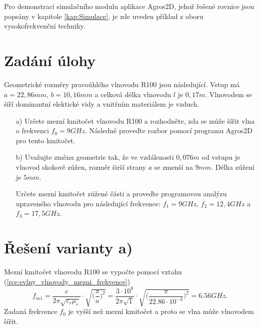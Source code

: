 
Pro demonstraci simulačního modulu aplikace Agros2D, jehož řešené rovnice jsou popsány v kapitole \ref{kap:Simulace}, je zde uveden příklad z oboru vysokofrekvenční techniky. 

\section{Zadání úlohy}
Geometrické rozměry pravoúhlého vlnovodu R100 jsou následující. Vstup má $a = 22,86 \unit{mm}$, $b = 10,16 \unit{mm}$ a celková délka vlnovodu $l$ je $0,17 \unit{m}$. Vlnovodem se šíří dominantní elektické vidy a vnitřním materiálem je vzduch. 
\begin{enumerate}
\item[a)] Určete mezní kmitočet vlnovodu R100 a rozhodněte, zda se může šířit vlna o frekvenci $f_0 = 9 \unit{GHz}$. Následně proveďte rozbor pomocí programu Agros2D pro tento kmitočet. 
\item[b)] Uvažujte změnu geometrie tak, že ve vzdálenosti $0,076 \unit{m}$ od vstupu je vlnovod skokově zúžen, rozměr širší strany $a$ se zmenší na $9 \unit {mm}$. Délka zúžení je $5 \unit{mm}$. 

Určete mezní kmitočet zúžené části a proveďte programovou analýzu upraveného vlnovodu pro následující frekvence:  $f_1 = 9 \unit{GHz}$, $f_2 = 12,4 \unit{GHz}$ a $f_3 = 17,5 \unit{GHz}$.
\end{enumerate}

\section{Řešení varianty a)}
Mezní kmitočet vlnovodu R100 se vypočte pomocí vztahu (\ref{rce:evlny_vlnovody_mezni_frekvence})
\begin{displaymath}
f_{m1} = \frac{c}{2\pi\sqrt{\varepsilon_{r}\mu_{r}}}\cdot\sqrt{\bigg(\frac{\pi}{a}\bigg)^{2}} = \frac{3\cdot 10^{8}}{2\pi\sqrt{1}}\cdot\sqrt{\bigg(\frac{\pi}{22.86\cdot 10^{-3}}\bigg)^{2}} = 6.56 \unit{GHz}.
\end{displaymath}
Zadaná frekvence $f_0$ je vyšší než mezní kmitočet a proto se vlna může vlnovodem šířit.


